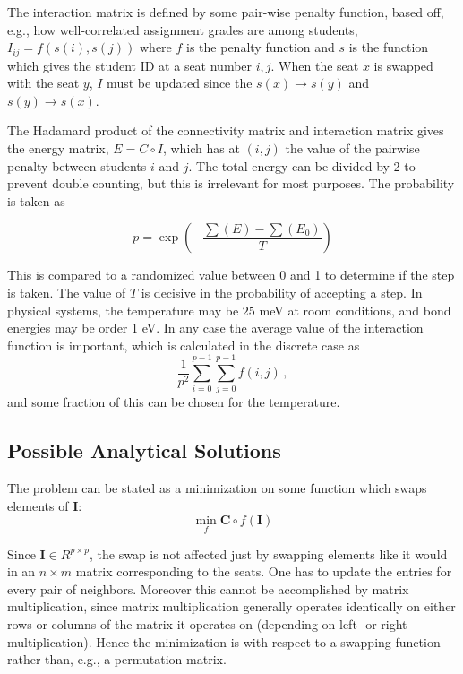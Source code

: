 \documentclass{article}
\begin{document}
The interaction matrix is defined by some pair-wise penalty function, based off, e.g., how well-correlated assignment grades are among students, $I_{ij} = f(s(i), s(j))$ where $f$ is the penalty function and $s$ is the function which gives the student ID at a seat number $i, j$. When the seat $x$ is swapped with the seat $y$, $I$ must be updated since the $s(x) \to s(y)$ and $s(y) \to s(x)$. 

The Hadamard product of the connectivity matrix and interaction matrix gives the energy matrix, $E = C \circ I$, which has at $(i,j)$ the value of the pairwise penalty between students $i$ and $j$. The total energy can be divided by 2 to prevent double counting, but this is irrelevant for most purposes. The probability is taken as

$$p = \exp\left(-\frac{\sum(E) - \sum(E_0)}{T} \right) $$

This is compared to a randomized value between 0 and 1 to determine if the step is taken. The value of $T$ is decisive in the probability of accepting a step. In physical systems, the temperature may be $25$ meV at room conditions, and bond energies may be order 1 eV. In any case the average value of the interaction function is important, which is calculated in the discrete case as $$\frac{1}{p^2} \sum_{i=0}^{p-1} \sum_{j=0}^{p-1} f(i,j) \,,$$ and some fraction of this can be chosen for the temperature. 

\subsection{Possible Analytical Solutions}

The problem can be stated as a minimization on some function which swaps elements of $\mathbf{I}$:
$$\min_{f} \mathbf{C} \circ f(\mathbf{I})  $$

Since $\mathbf{I} \in R^{p \times p}$, the swap is not affected just by swapping elements like it would in an $n \times m$ matrix corresponding to the seats. One has to update the entries for every pair of neighbors. Moreover this cannot be accomplished by matrix multiplication, since matrix multiplication generally operates identically on either rows or columns of the matrix it operates on (depending on left- or right-multiplication). Hence the minimization is with respect to a swapping function rather than, e.g., a permutation matrix.
\end{document}
